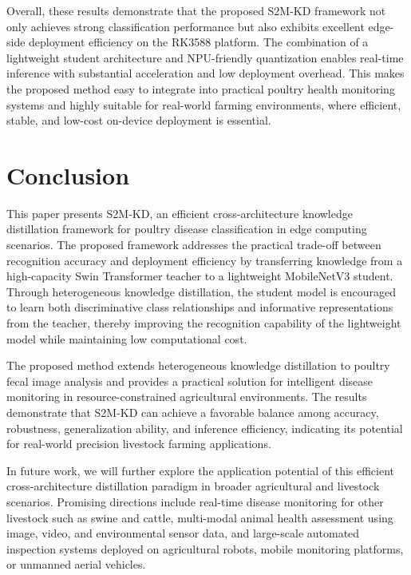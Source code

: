 \documentclass[review]{elsarticle}
\begin{document}
Overall, these results demonstrate that the proposed S2M-KD framework not only achieves strong classification performance but also exhibits excellent edge-side deployment efficiency on the RK3588 platform. The combination of a lightweight student architecture and NPU-friendly quantization enables real-time inference with substantial acceleration and low deployment overhead. This makes the proposed method easy to integrate into practical poultry health monitoring systems and highly suitable for real-world farming environments, where efficient, stable, and low-cost on-device deployment is essential.

\section{Conclusion}

This paper presents S2M-KD, an efficient cross-architecture knowledge distillation framework for poultry disease classification in edge computing scenarios. The proposed framework addresses the practical trade-off between recognition accuracy and deployment efficiency by transferring knowledge from a high-capacity Swin Transformer teacher to a lightweight MobileNetV3 student. Through heterogeneous knowledge distillation, the student model is encouraged to learn both discriminative class relationships and informative representations from the teacher, thereby improving the recognition capability of the lightweight model while maintaining low computational cost.

The proposed method extends heterogeneous knowledge distillation to poultry fecal image analysis and provides a practical solution for intelligent disease monitoring in resource-constrained agricultural environments. The results demonstrate that S2M-KD can achieve a favorable balance among accuracy, robustness, generalization ability, and inference efficiency, indicating its potential for real-world precision livestock farming applications.

In future work, we will further explore the application potential of this efficient cross-architecture distillation paradigm in broader agricultural and livestock scenarios. Promising directions include real-time disease monitoring for other livestock such as swine and cattle, multi-modal animal health assessment using image, video, and environmental sensor data, and large-scale automated inspection systems deployed on agricultural robots, mobile monitoring platforms, or unmanned aerial vehicles.
\end{document}

